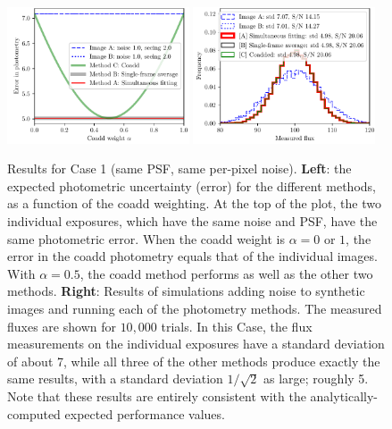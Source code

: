\documentclass[letter,11pt]{article}
\begin{document}
\begin{figure}[b!]
  \begin{center}
    \includegraphics[width=0.48\textwidth]{coadd-00}
    \includegraphics[width=0.48\textwidth]{coadd-01}
  \end{center}
  \caption{Results for Case 1 (same PSF, same per-pixel noise).  \textbf{Left}: the expected photometric
    uncertainty (error) for the different methods, as a function of
    the coadd weighting.  At the top of the plot, the two individual
    exposures, which have the same noise and PSF, have the same
    photometric error.  When the coadd weight is $\alpha = 0$ or $1$,
    the error in the coadd photometry equals that of the individual
    images.  With $\alpha = 0.5$, the coadd method performs as well as
    the other two methods.
    \newline \textbf{Right}: Results of simulations
    adding noise to synthetic images and running each of the
    photometry methods.  The measured fluxes are shown for $10,000$
    trials.  In this Case, the flux measurements on the individual
    exposures have a standard deviation of about 7, while all three
    of the other methods produce exactly the same results, with a standard
    deviation $1/\sqrt{2}$ as large; roughly 5.  Note that these results are
    entirely consistent with the analytically-computed expected performance values.
    \label{fig:caseone}}
\end{figure}
\end{document}
